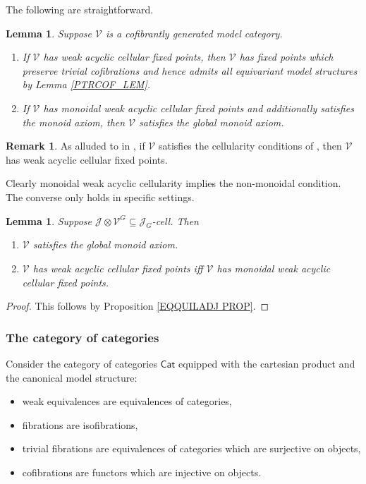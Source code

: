 \documentclass[a4paper,10pt
,draft
]{article}%
\numberwithin{equation}{section}
\numberwithin{figure}{section}
\newtheorem{lemma}[equation]{Lemma}%
\theoremstyle{definition} %
\newtheorem{remark}[equation]{Remark}%
\newcommand{\Cat}{\mathsf{Cat}}
\newcommand{\V}{\ensuremath{\mathcal V}}
\newcommand{\1}{\ensuremath{\mathbbm 1}}%
\begin{document}
The following are straightforward.
\begin{lemma}
      Suppose $\V$ is a cofibrantly generated model category.
      \begin{enumerate}[label=(\roman*)]
      \item If $\V$ has weak acyclic cellular fixed points, then $\V$ has fixed points which preserve trivial cofibrations and hence
            admits all equivariant model structures by Lemma \ref{PTRCOF_LEM}.
      \item If $\V$ has monoidal weak acyclic cellular fixed points and additionally satisfies the monoid axiom,
            then $\V$ satisfies the global monoid axiom.
      \end{enumerate}
\end{lemma}

\begin{remark}
      As alluded to in \cite[Remark 2.7]{Ste16}, if $\V$ satisfies the cellularity conditions of \cite[Prop. 2.6]{Ste16}, then $\V$ has weak acyclic cellular fixed points.      
\end{remark}


Clearly monoidal weak acyclic cellularity implies the non-monoidal condition.
The converse only holds in specific settings.
\begin{lemma}
      \label{JVG_JG_LEM}
      Suppose $\mathcal J \otimes \V^G \subseteq \mathcal J_G$-cell. Then
      \begin{enumerate}[label=(\roman*)]
      \item $\V$ satisfies the global monoid axiom.
      \item $\V$ has weak acyclic cellular fixed points iff $\V$ has monoidal weak acyclic cellular fixed points.
      \end{enumerate}
\end{lemma}
\begin{proof}
      This follows by Proposition \ref{EQQUILADJ PROP}.
\end{proof}




\subsubsection*{The category of categories}

Consider the category of categories $\Cat$ equipped with the cartesian product and the canonical model structure:
\begin{itemize}
\item weak equivalences are equivalences of categories,
\item fibrations are isofibrations,
\item trivial fibrations are equivalences of categories which are surjective on objects,
\item cofibrations are functors which are injective on objects.
\end{itemize}
\end{document}
